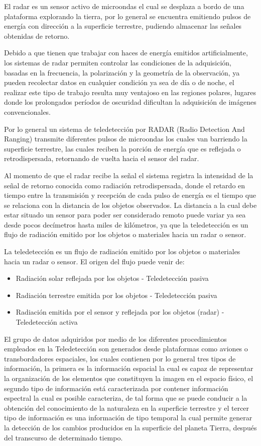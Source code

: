 El radar es un sensor activo de microondas el cual se desplaza a bordo de una plataforma explorando la tierra, por lo general se encuentra emitiendo pulsos de energía con dirección a la superficie terrestre, pudiendo almacenar las señales obtenidas de retorno. \cite{Marchionni2014}

Debido a que tienen que trabajar con haces de energía emitidos artificialmente, los sistemas de radar permiten controlar las condiciones de la adquisición, basadas en la frecuencia, la polarización y la geometría de la observación, ya pueden recolectar datos en cualquier condición ya sea de día o de noche, el realizar este tipo de trabajo resulta muy ventajoso en las regiones polares, lugares donde los prolongados períodos de oscuridad dificultan la adquisición de imágenes convencionales. 

Por lo general un sistema de teledetección por RADAR (Radio Detection And Ranging) transmite diferentes pulsos de microondas los cuales van barriendo la superficie terrestre, las cuales reciben la porción de energía que es reflejada o retrodispersada, retornando de vuelta hacia el sensor del radar.

Al momento de que el radar recibe la señal el sistema registra la intensidad de la señal de retorno conocida como radiación retrodispersada, donde el retardo en tiempo entre la transmisión y recepción de cada pulso de energía es el tiempo que se relaciona con la distancia de los objetos observados.
La distancia a la cual debe estar situado un sensor para poder ser considerado remoto puede variar ya sea desde pocos decímetros hasta miles de kilómetros, ya que la teledetección es un flujo de radiación emitido por los objetos o materiales hacia un radar o sensor. 

La teledetección es un flujo de radiación emitido por los objetos o materiales hacia un radar o sensor. El origen del flujo puede venir de:

\begin{itemize}
\item Radiación solar reflejada por los objetos - Teledetección pasiva
\item Radiación terrestre emitida por los objetos - Teledetección pasiva
\item Radiación emitida por el sensor y reflejada por los objetos (radar) - Teledetección activa
\end{itemize}

El grupo de datos adquiridos por medio de los diferentes procedimientos empleados en la Teledetección son generados desde plataformas como aviones o transbordadores espaciales, los cuales contienen por lo general tres tipos de información, la primera es la información espacial la cual es capaz de representar la organización de los elementos que constituyen la imagen en el espacio físico, el segundo tipo de información está caracterizada por contener información espectral la cual es posible caracteriza, de tal forma que se puede conducir a la obtención del conocimiento de la naturaleza en la superficie terrestre y el tercer tipo de información es una información de tipo temporal la cual permite generar la detección de los cambios producidos en la superficie del planeta Tierra, después del transcurso de determinado tiempo. \cite{SacristanRomero}

